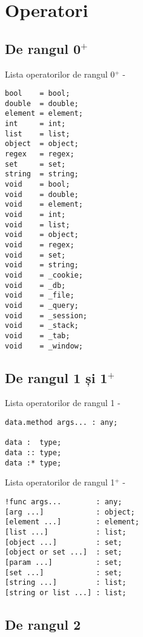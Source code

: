 \section{Operatori}

\subsection{De rangul 0$^+$}

\noindent Lista operatorilor de rangul 0$^+$ -
\begin{verbatim}
bool    = bool;
double  = double;
element = element;
int     = int;
list    = list;
object  = object;
regex   = regex;
set     = set;
string  = string;
void    = bool;
void    = double;
void    = element;
void    = int;
void    = list;
void    = object;
void    = regex;
void    = set;
void    = string;
void    = _cookie;
void    = _db;
void    = _file;
void    = _query;
void    = _session;
void    = _stack;
void    = _tab;
void    = _window;
\end{verbatim}

\subsection{De rangul 1 și 1$^+$}

\noindent Lista operatorilor de rangul 1 -
\begin{verbatim}
data.method args... : any;

data :  type;
data :: type;
data :* type;
\end{verbatim}

\noindent Lista operatorilor de rangul 1$^+$ -
\begin{verbatim}
!func args...        : any;
[arg ...]            : object;
[element ...]        : element;
[list ...]           : list;
[object ...]         : set;
[object or set ...]  : set;
[param ...]          : set;
[set ...]            : set;
[string ...]         : list;
[string or list ...] : list;
\end{verbatim}

\subsection{De rangul 2}

